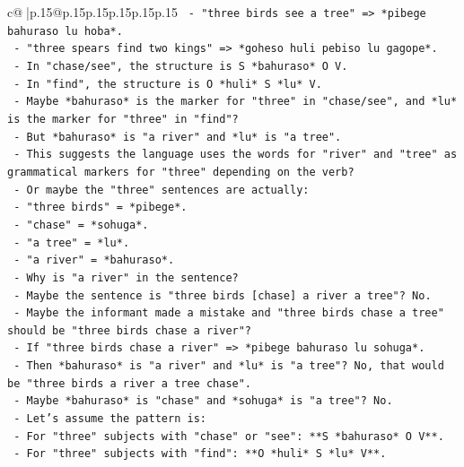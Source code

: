 \documentclass{article}
\begin{document}
{\begin{supertabular}{c@{$\;$}|p{.15\linewidth}@{}p{.15\linewidth}p{.15\linewidth}p{.15\linewidth}p{.15\linewidth}p{.15\linewidth}}
{{{\texttt{        {-}   "three birds see a tree" => *pibege bahuraso lu hoba*.} \\
\texttt{        {-}   "three spears find two kings" => *goheso huli pebiso lu gagope*.} \\
\texttt{        {-}   In "chase/see", the structure is S *bahuraso* O V.} \\
\texttt{        {-}   In "find", the structure is O *huli* S *lu* V.} \\
\texttt{        {-}   Maybe *bahuraso* is the marker for "three" in "chase/see", and *lu* is the marker for "three" in "find"?} \\
\texttt{        {-}   But *bahuraso* is "a river" and *lu* is "a tree".} \\
\texttt{        {-}   This suggests the language uses the words for "river" and "tree" as grammatical markers for "three" depending on the verb?} \\
\texttt{        {-}   Or maybe the "three" sentences are actually:} \\
\texttt{            {-}   "three birds" = *pibege*.} \\
\texttt{            {-}   "chase" = *sohuga*.} \\
\texttt{            {-}   "a tree" = *lu*.} \\
\texttt{            {-}   "a river" = *bahuraso*.} \\
\texttt{            {-}   Why is "a river" in the sentence?} \\
\texttt{            {-}   Maybe the sentence is "three birds {[}chase{]} a river a tree"? No.} \\
\texttt{            {-}   Maybe the informant made a mistake and "three birds chase a tree" should be "three birds chase a river"?} \\
\texttt{            {-}   If "three birds chase a river" => *pibege bahuraso lu sohuga*.} \\
\texttt{            {-}   Then *bahuraso* is "a river" and *lu* is "a tree"? No, that would be "three birds a river a tree chase".} \\
\texttt{            {-}   Maybe *bahuraso* is "chase" and *sohuga* is "a tree"? No.} \\
\texttt{            {-}   Let's assume the pattern is:} \\
\texttt{                {-}   For "three" subjects with "chase" or "see": **S *bahuraso* O V**.} \\
\texttt{                {-}   For "three" subjects with "find": **O *huli* S *lu* V**.} \\
}}}
\end{supertabular}}
\end{document}

